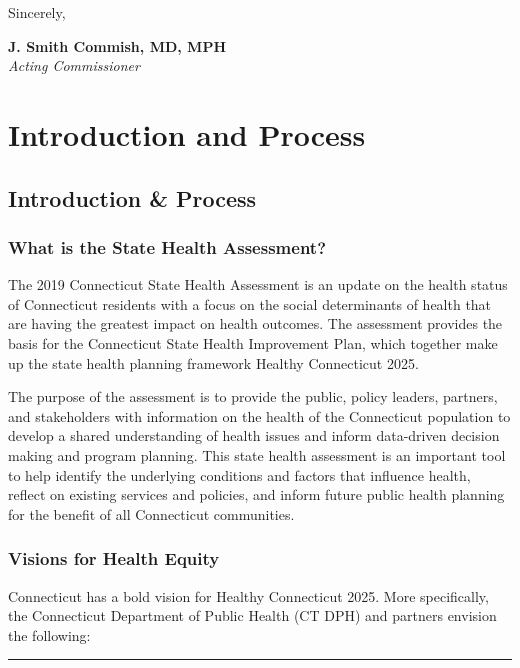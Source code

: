 \documentclass[
  letterpaper,
  DIV=11,
  numbers=noendperiod]{scrreprt}
\begin{document}
Sincerely,

\textbf{J. Smith Commish, MD, MPH}\\
\emph{Acting Commissioner}

\part{Introduction and Process}

\chapter{Introduction \& Process}\label{introduction-process}

\section{What is the State Health
Assessment?}\label{what-is-the-state-health-assessment}

The 2019 Connecticut State Health Assessment is an update on the health
status of Connecticut residents with a focus on the social determinants
of health that are having the greatest impact on health outcomes. The
assessment provides the basis for the Connecticut State Health
Improvement Plan, which together make up the state health planning
framework Healthy Connecticut 2025.

The purpose of the assessment is to provide the public, policy leaders,
partners, and stakeholders with information on the health of the
Connecticut population to develop a shared understanding of health
issues and inform data-driven decision making and program planning. This
state health assessment is an important tool to help identify the
underlying conditions and factors that influence health, reflect on
existing services and policies, and inform future public health planning
for the benefit of all Connecticut communities.

\section{Visions for Health Equity}\label{visions-for-health-equity}

Connecticut has a bold vision for Healthy Connecticut 2025. More
specifically, the Connecticut Department of Public Health (CT DPH) and
partners envision the following:

\begin{center}\rule{0.5\linewidth}{0.5pt}\end{center}
\end{document}
